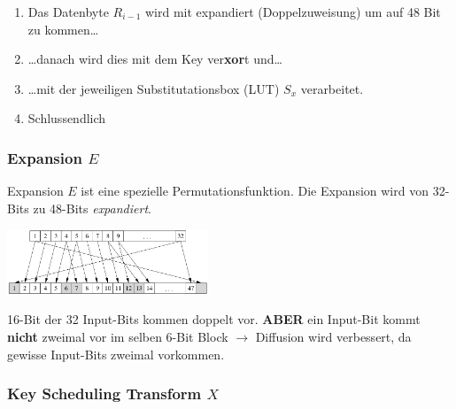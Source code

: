 \documentclass[
  10pt,
  a4paper,
  twocolumn]{article}
\providecommand{\tightlist}{%
  \setlength{\itemsep}{0pt}\setlength{\parskip}{0pt}}\usepackage{longtable,booktabs,array}
\begin{document}
\begin{enumerate}
\def\labelenumi{\arabic{enumi}.}
\tightlist
\item
  Das Datenbyte \(R_{i-1}\) wird mit expandiert (Doppelzuweisung) um auf
  48 Bit zu kommen\ldots{}
\item
  \ldots danach wird dies mit dem Key ver\textbf{xor}t und\ldots{}
\item
  \ldots mit der jeweiligen Substitutationsbox (LUT) \(S_x\)
  verarbeitet.
\item
  Schlussendlich
\end{enumerate}

\subsubsection{\texorpdfstring{Expansion
\(E\)}{Expansion E}}\label{expansion-e}

Expansion \(E\) ist eine spezielle Permutationsfunktion. Die Expansion
wird von 32-Bits zu 48-Bits \emph{expandiert}.

\begin{center}
\includegraphics[width=6cm,height=\textheight]{images/crypto/expansion_function.png}
\end{center}

\begin{tcolorbox}[enhanced jigsaw, toprule=.15mm, opacityback=0, colbacktitle=quarto-callout-important-color!10!white, breakable, colframe=quarto-callout-important-color-frame, title=\textcolor{quarto-callout-important-color}{\faExclamation}\hspace{0.5em}{Wichtig}, left=2mm, arc=.35mm, toptitle=1mm, bottomrule=.15mm, rightrule=.15mm, titlerule=0mm, bottomtitle=1mm, leftrule=.75mm, opacitybacktitle=0.6, coltitle=black, colback=white]

16-Bit der 32 Input-Bits kommen doppelt vor. \textbf{ABER} ein Input-Bit
kommt \textbf{nicht} zweimal vor im selben 6-Bit Block \(\rightarrow\)
Diffusion wird verbessert, da gewisse Input-Bits zweimal vorkommen.

\end{tcolorbox}

\subsubsection{\texorpdfstring{Key Scheduling Transform
\(X\)}{Key Scheduling Transform X}}\label{key-scheduling-transform-x}
\end{document}
